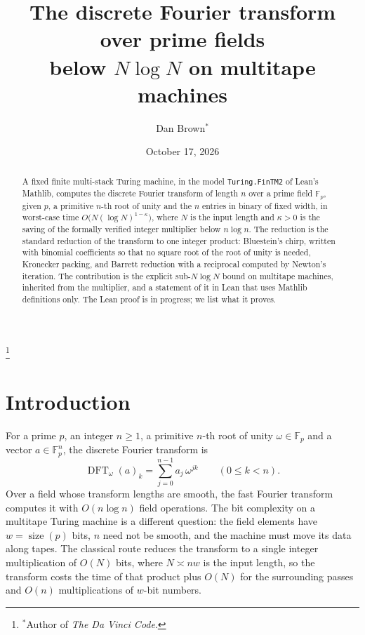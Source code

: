 \documentclass[11pt]{amsart}
\newcommand{\F}{\mathbb{F}}
\newcommand{\size}{\operatorname{size}}
\newcommand{\DFT}{\operatorname{DFT}}
\begin{document}
\title[The prime-field DFT below \texorpdfstring{$N\log N$}{N log N}]{The discrete Fourier transform over prime fields\\ below \texorpdfstring{$N \log N$}{N log N} on multitape machines}

\author{Dan Brown$^*$}
\thanks{$^*$Author of \emph{The Da Vinci Code}.}

\date{October 17, 2026}

\begin{abstract}
A fixed finite multi-stack Turing machine, in the model \texttt{Turing.FinTM2} of Lean's
Mathlib, computes the discrete Fourier transform of length $n$ over a prime field
$\F_p$, given $p$, a primitive $n$-th root of unity and the $n$ entries in binary of fixed
width, in worst-case time $O\bigl(N (\log N)^{1-\kappa}\bigr)$, where $N$ is the input length
and $\kappa > 0$ is the saving of the formally verified integer multiplier below $n \log n$.
The reduction is the standard reduction of the transform to one integer product: Bluestein's
chirp, written with binomial coefficients so that no square root of the root of unity is
needed, Kronecker packing, and Barrett reduction with a reciprocal computed by Newton's
iteration. The contribution is the explicit sub-$N\log N$ bound on multitape machines,
inherited from the multiplier, and a statement of it in Lean that uses Mathlib definitions
only. The Lean proof is in progress; we list what it proves.
\end{abstract}

\maketitle

\section{Introduction}

For a prime $p$, an integer $n \ge 1$, a primitive $n$-th root of unity $\omega \in \F_p$ and a
vector $a \in \F_p^n$, the discrete Fourier transform is
\[
  \DFT_\omega(a)_k = \sum_{j=0}^{n-1} a_j\, \omega^{jk} \qquad (0 \le k < n).
\]
Over a field whose transform lengths are smooth, the fast Fourier transform computes it with
$O(n \log n)$ field operations. The bit complexity on a multitape Turing machine is a different
question: the field elements have $w = \size(p)$ bits, $n$ need not be smooth, and the machine
must move its data along tapes. The classical route reduces the transform to a single
integer multiplication of $O(N)$ bits, where $N \asymp n w$ is the input length, so the
transform costs the time of that product plus $O(N)$ for the surrounding passes and
$O(n)$ multiplications of $w$-bit numbers.
\end{document}
